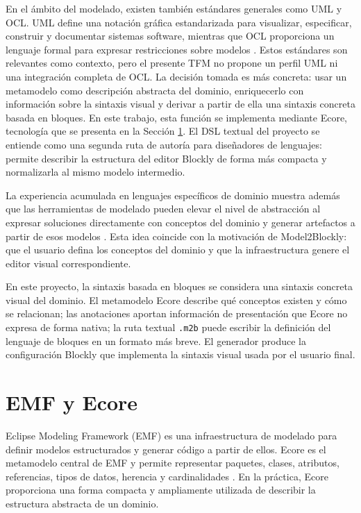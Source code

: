 En el ámbito del modelado, existen también estándares generales como UML y OCL.
UML define una notación gráfica estandarizada para visualizar, especificar,
construir y documentar sistemas software, mientras que OCL proporciona un
lenguaje formal para expresar restricciones sobre modelos \cite{omgUml,omgOcl}.
Estos estándares son relevantes como contexto, pero el presente TFM no propone
un perfil UML ni una integración completa de OCL. La decisión tomada es más
concreta: usar un metamodelo como descripción abstracta del dominio,
enriquecerlo con información sobre la sintaxis visual y derivar a partir de ella
una sintaxis concreta basada en bloques. En este trabajo, esta función se
implementa mediante Ecore, tecnología que se presenta en la Sección
\ref{sec:emf-ecore}.
El DSL textual del proyecto se entiende como una segunda ruta de autoría para
diseñadores de lenguajes: permite describir la estructura del editor Blockly de
forma más compacta y normalizarla al mismo modelo intermedio.

La experiencia acumulada en lenguajes específicos de dominio muestra además que
las herramientas de modelado pueden elevar el nivel de abstracción al expresar
soluciones directamente con conceptos del dominio y generar artefactos a partir
de esos modelos \cite{luoma2004dsm}. Esta idea coincide con la motivación de
Model2Blockly: que el usuario defina los conceptos del dominio y que la
infraestructura genere el editor visual correspondiente.

En este proyecto, la sintaxis basada en bloques se considera una sintaxis
concreta visual del dominio. El metamodelo Ecore describe qué conceptos existen
y cómo se relacionan; las anotaciones aportan información de presentación que
Ecore no expresa de forma nativa; la ruta textual \texttt{.m2b} puede escribir
la definición del lenguaje de bloques en un formato más breve. El generador
produce la configuración Blockly que implementa la sintaxis visual usada por el
usuario final.

\section{EMF y Ecore}
\label{sec:emf-ecore}

Eclipse Modeling Framework (EMF) es una infraestructura de modelado para definir
modelos estructurados y generar código a partir de ellos. Ecore es el
metamodelo central de EMF y permite representar paquetes, clases, atributos,
referencias, tipos de datos, herencia y cardinalidades
\cite{emfOverview,steinberg2008emf}. En la práctica, Ecore proporciona una
forma compacta y ampliamente utilizada de describir la estructura abstracta de
un dominio.

